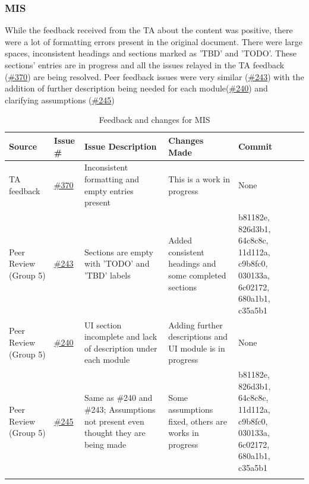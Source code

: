 \documentclass{article}
\begin{document}
\subsubsection{MIS}
While the feedback received from the TA about the content was positive, there were a lot of formatting errors 
present in the original document. There were large spaces, inconsistent headings and sections marked as 'TBD' and 'TODO'.
These sections' entries are in progress and all the issues relayed in the TA feedback (\href{https://github.com/M9Huynh/technically-functional/issues/370}{\#370}) are being resolved.
Peer feedback issues were very similar (\href{https://github.com/M9Huynh/technically-functional/issues/243}{\#243}) with the addition of further description being needed for each module(\href{https://github.com/M9Huynh/technically-functional/issues/240}{\#240})
and clarifying assumptions (\href{https://github.com/M9Huynh/technically-functional/issues/245}{\#245})
{\small
\begin{xltabular}{\textwidth}{>{\raggedright\arraybackslash}X >{\raggedright\arraybackslash}p{0.8cm} >{\raggedright\arraybackslash}X >{\raggedright\arraybackslash}X >{\raggedright\arraybackslash}p{2.0cm}}
\toprule
\textbf{Source} & \textbf{Issue \#} & \textbf{Issue Description} & \textbf{Changes Made} & \textbf{Commit} \\
\midrule
TA feedback & \href{https://github.com/M9Huynh/technically-functional/issues/370}{\#370} & Inconsistent formatting and empty entries present & This is a work in progress & None \\
\midrule
Peer Review (Group 5) & \href{https://github.com/M9Huynh/technically-functional/issues/243}{\#243} & Sections are empty with 'TODO' and 'TBD' labels & Added consistent headings and some completed sections & b81182e, 826d3b1, 64c8c8c, 11d112a, c9b8fc0, 030133a, 6c02172, 680a1b1, c35a5b1\\
\midrule
Peer Review (Group 5) & \href{https://github.com/M9Huynh/technically-functional/issues/240}{\#240} & UI section incomplete and lack of description under each module & Adding further descriptions and UI module is in progress & None \\
\midrule
Peer Review (Group 5) & \href{https://github.com/M9Huynh/technically-functional/issues/245}{\#245} & Same as \#240 and \#243; Assumptions not present even thought they are being made & Some assumptions fixed, others are works in progress & b81182e, 826d3b1, 64c8c8c, 11d112a, c9b8fc0, 030133a, 6c02172, 680a1b1, c35a5b1 \\
\bottomrule
\caption{Feedback and changes for MIS}
\label{tab:mis}
\end{xltabular}
}
\end{document}
